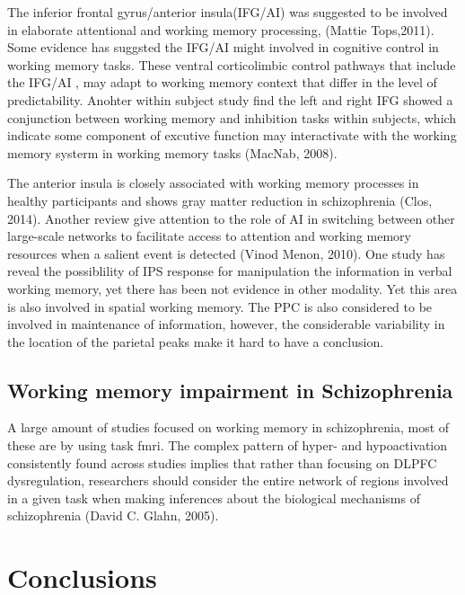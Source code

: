 \documentclass[preprint,authoryear,review,12pt]{elsarticle}
\begin{document}
The inferior frontal gyrus/anterior insula(IFG/AI) was suggested to be involved in elaborate attentional and working memory processing,  (Mattie Tops,2011). Some evidence has suggsted the IFG/AI might involved in cognitive control in working memory tasks. These ventral corticolimbic control pathways that include the IFG/AI , may adapt to working memory context that differ in the level of predictability. Anohter within subject study find the left and right IFG showed a conjunction between working memory and inhibition tasks within subjects, which indicate some component of excutive function may interactivate with the working memory systerm in working memory tasks (MacNab, 2008).

The anterior insula is closely associated with working memory processes in healthy participants and shows gray matter reduction in schizophrenia (Clos, 2014). Another review give attention to the role of AI in switching between other large-scale networks to facilitate access to attention and working memory resources when a salient event is detected (Vinod Menon, 2010). One study has reveal the possiblility of IPS response for manipulation the information in verbal working memory, yet there has been not evidence in other modality. Yet this area is also involved in spatial working memory. The PPC is also considered to be involved in maintenance of information, however, the considerable variability in the location of the parietal peaks make it hard to have a conclusion.

\subsection*{Working memory impairment in Schizophrenia}

A large amount of studies focused on working memory in schizophrenia, most of these are by using task fmri.  The complex pattern of hyper- and hypoactivation consistently found across studies implies that rather than focusing on DLPFC dysregulation, researchers should consider the entire network of regions involved in a given task when making inferences about the biological mechanisms of schizophrenia (David C. Glahn, 2005). 


\section*{Conclusions}

\end{document}
